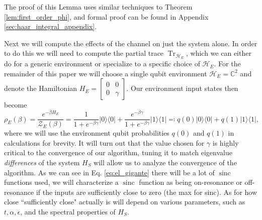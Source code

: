 \documentclass{article}
\newcommand{\ketbra}[2]{| #1\rangle\! \langle #2|}
\DeclareMathOperator{\Tr}{Tr}
\newcommand{\hilb}{\mathcal{H}}
\newcommand{\partfun}{\mathcal{Z}}
\DeclareMathOperator{\sinc}{sinc}
\begin{document}
\noindent The proof of this Lemma uses similar techniques to Theorem \ref{lem:first_order_phi}, and formal proof can be found in Appendix \ref{sec:haar_integral_appendix}.

Next we will compute the effects of the channel on just the system alone. In order to do this we will need to compute the partial trace $\Tr_{\hilb_E}$, which we can either do for a generic environment or specialize to a specific choice of $\hilb_E$. For the remainder of this paper we will choose a single qubit environment $\hilb_E = \mathbb{C}^2$ and denote the Hamiltonian $H_E = \begin{bmatrix} 0 & 0 \\ 0 & \gamma \end{bmatrix}$. Our environment input states then become
\begin{equation}
    \rho_E(\beta) = \frac{e^{-\beta H_E}}{\partfun_E(\beta)} = \frac{1}{1 + e^{-\beta \gamma}} \ketbra{0}{0} + \frac{e^{-\beta \gamma}}{1 + e^{-\beta \gamma}} \ketbra{1}{1} \eqqcolon q(0) \ketbra{0}{0} + q(1) \ketbra{1}{1} \label{eq:env_state_def},
\end{equation}
where we will use the environment qubit probabilities $q(0)$ and $q(1)$ in calculations for brevity. It will turn out that the value chosen for $\gamma$ is highly critical to the convergence of our algorithm, tuning it to match eigenvalue \emph{differences} of the system $H_S$ will allow us to analyze the convergence of the algorithm. As we can see in Eq. \eqref{eq:el_gigante} there will be a lot of $\sinc$ functions used, we will characterize a $\sinc$ function as being on-resonance or off-resonance if the inputs are sufficiently close to zero (the max for sinc). As for how close ``sufficiently close" actually is will depend on various parameters, such as $t, \alpha, \epsilon$, and the spectral properties of $H_S$. 
\end{document}
